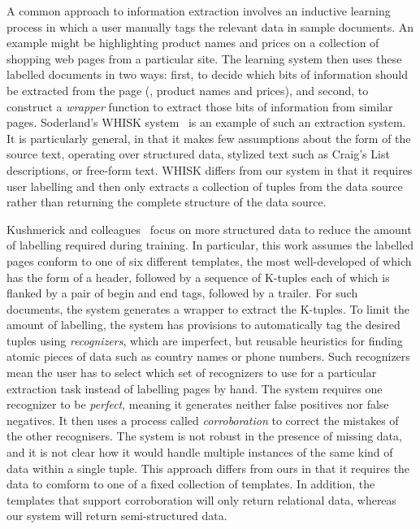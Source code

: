 A common approach to information extraction involves an inductive
learning process in which a user manually tags the relevant data in sample documents.
An example might be highlighting product names and prices on a
collection of shopping web pages from a particular site.  The learning
system then uses these labelled documents in two ways: first, to
decide which bits of information should be extracted from the page
(\ie, product names and prices), and second, to construct a
\textit{wrapper} function to extract those bits of information from
similar pages.  Soderland's WHISK system~\cite{soderland:whisk} is an
example of such an extraction system.  It is particularly general, in
that it makes few assumptions about the form of the source text,
operating over structured data, stylized text such as Craig's List
descriptions, or free-form text.  WHISK differs from our system in
that it requires user labelling and then only extracts a collection of
tuples from the data source rather than returning the complete
structure of the data source.


Kushmerick and
colleagues~\cite{kushmerick-phd1997,KushmerickWD97:Wrapper} focus on
more structured data to reduce the amount of labelling required during
training.  In particular, this work assumes the labelled pages conform
to one of six different templates, the most well-developed of which
has the form of a header, followed by a sequence of K-tuples each of
which is flanked by a pair of begin and end tags, followed by a
trailer.  For such documents, the system generates a wrapper to
extract the K-tuples.  To limit the amount of labelling, the system
has provisions to automatically tag the desired tuples using {\it
recognizers}, which are imperfect, but reusable heuristics for finding
atomic pieces of data such as country names or phone numbers.  Such
recognizers mean the user has to select which set of recognizers to
use for a particular extraction task instead of labelling pages by
hand.  The system requires one recognizer to be {\it perfect}, meaning
it generates neither false positives nor false negatives.  It then
uses a process called {\it corroboration} to correct the mistakes of
the other recognisers.  The system is not robust in the presence of
missing data, and it is not clear how it would handle multiple
instances of the same kind of data within a single tuple. This
approach differs from ours in that it requires the data to comform to
one of a fixed collection of templates.  In addition, the 
templates that support corroboration will only return relational data,
whereas our system will return semi-structured data.


